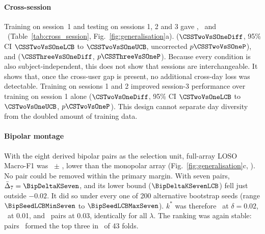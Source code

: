 \paragraph{Cross-session}
Training on session~1 and testing on sessions 1, 2 and 3 gave \CSOneSOne, \CSOneSTwo\ and \CSOneSThree\ (Table~\ref{tab:cross_session}, Fig.~\ref{fig:generalisation}a).  ($\CSSTwoVsSOneDiff$, 95\% CI $\CSSTwoVsSOneLCB$ to $\CSSTwoVsSOneUCB$, uncorrected $p \CSSTwoVsSOneP$), and  ($\CSSThreeVsSOneDiff$, $p \CSSThreeVsSOneP$). Because every condition is also subject-independent, this does not show that sessions are interchangeable. It shows that, once the cross-user gap is present, no additional cross-day loss was detectable. Training on sessions 1 and 2 improved session-3 performance over training on session 1 alone ($\CSTwoVsOneDiff$, 95\% CI $\CSTwoVsOneLCB$ to $\CSTwoVsOneUCB$, $p \CSTwoVsOneP$). This design cannot separate day diversity from the doubled amount of training data.

\paragraph{Bipolar montage}
With the eight derived bipolar pairs as the selection unit, full-array LOSO Macro-F1 was \BipFull\ $\pm$ \BipFullSD, lower than the monopolar array (Fig.~\ref{fig:generalisation}c, ). No pair could be removed within the primary margin. With seven pairs, $\bar\Delta_7 = \BipDeltaKSeven$, and its lower bound ($\BipDeltaKSevenLCB$) fell just outside $-0.02$. It did so under every one of 200 alternative bootstrap seeds (range $\BipSeedLCBMinSeven$ to $\BipSeedLCBMaxSeven$). $k^*$ was therefore \BipKStarMarginPtTwo\ at $\delta = 0.02$, \BipKStarMarginPtOne\ at 0.01, and \BipKStarMarginPtThree\ pairs at 0.03, identically for all $\lambda$. The ranking was again stable: pairs \BipTopThreeSet\ formed the top three in \BipTopThreeFolds\ of 43 folds. 

